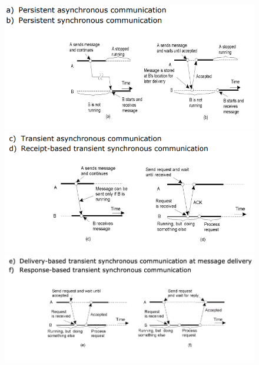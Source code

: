 \documentclass[12pt, a4paper]{article}
\begin{document}
    \begin{figure}[htbp]
        \centering
        \includegraphics[scale=0.7]{asysy.png}
        \includegraphics[scale=0.7]{tra.png}
        \includegraphics[scale=0.7]{ef.png}
    \end{figure}
    \newpage
\end{document}
